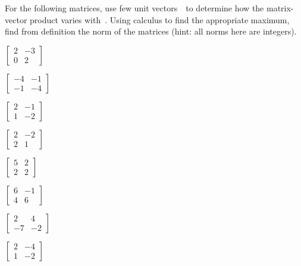 \begin{exercise} \label{eg:}
For the following matrices, use few unit vectors~\xv\ to determine how the matrix-vector product varies with~\xv.
Using calculus to find the appropriate maximum, find from definition the norm of the matrices (hint: all norms here are integers).
\begin{parts}
\item \(\begin{bmatrix} 2&-3\\0&2 \end{bmatrix}\)
\item \(\begin{bmatrix} -4&-1\\-1&-4 \end{bmatrix}\)
\item \(\begin{bmatrix} 2&-1\\1&-2 \end{bmatrix}\)
\item \(\begin{bmatrix} 2&-2\\2&1 \end{bmatrix}\)
\item \(\begin{bmatrix} 5&2\\2&2 \end{bmatrix}\)
\item \(\begin{bmatrix} 6&-1\\4&6 \end{bmatrix}\)
\item \(\begin{bmatrix} 2&4\\-7&-2 \end{bmatrix}\)
\item \(\begin{bmatrix} 2&-4\\1&-2 \end{bmatrix}\)
\end{parts}

\end{exercise}




